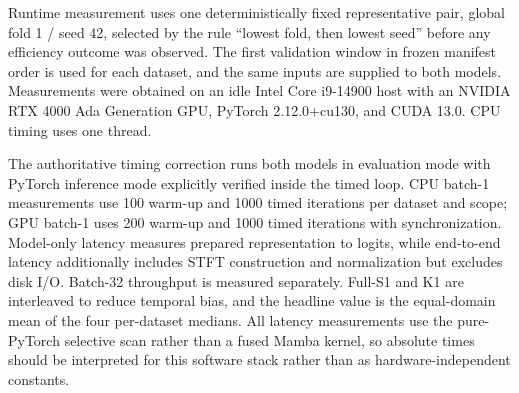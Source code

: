 Runtime measurement uses one deterministically fixed representative pair, global fold 1 / seed 42, selected by the rule ``lowest fold, then lowest seed'' before any efficiency outcome was observed. The first validation window in frozen manifest order is used for each dataset, and the same inputs are supplied to both models. Measurements were obtained on an idle Intel Core i9-14900 host with an NVIDIA RTX 4000 Ada Generation GPU, PyTorch 2.12.0+cu130, and CUDA 13.0. CPU timing uses one thread.

The authoritative timing correction runs both models in evaluation mode with PyTorch inference mode explicitly verified inside the timed loop. CPU batch-1 measurements use 100 warm-up and 1000 timed iterations per dataset and scope; GPU batch-1 uses 200 warm-up and 1000 timed iterations with synchronization. Model-only latency measures prepared representation to logits, while end-to-end latency additionally includes STFT construction and normalization but excludes disk I/O. Batch-32 throughput is measured separately. Full-S1 and K1 are interleaved to reduce temporal bias, and the headline value is the equal-domain mean of the four per-dataset medians. All latency measurements use the pure-PyTorch selective scan rather than a fused Mamba kernel, so absolute times should be interpreted for this software stack rather than as hardware-independent constants.
